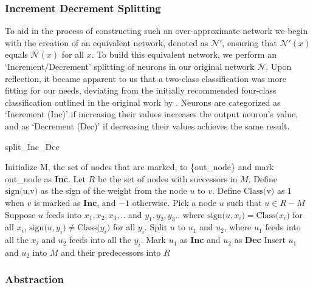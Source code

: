 \subsubsection{Increment Decrement Splitting}
To aid in the process of constructing such an over-approximate network 
we begin with the creation of an equivalent network, denoted as $\mathcal{N}'$,
 ensuring that $\mathcal{N'}(x)$ equals $\mathcal{N}(x)$ for all $x$.
To build this equivalent network, we perform an `Increment/Decrement'
splitting of neurons in our original network $\mathcal{N}$. Upon reflection, 
it became apparent to us that a two-class classification was more fitting for 
our needs, deviating from the initially recommended four-class classification 
outlined in the original work by \cite{b2}. Neurons are categorized as 
`Increment (Inc)' if increasing their values increases the output neuron's value,
 and as `Decrement (Dec)' if decreasing their values achieves the same result.

\begin{algorithm}[H]
    \caption{split\_Inc\_Dec}
    \begin{algorithmic}[1]
        \State Initialize M, the set of nodes that are marked, to \{out\_node\} and mark out\_node as \textbf{Inc}.
        \State Let $R$ be the set of nodes with successors in $M$.
        \State Define $\text{sign(u,v)}$ as the sign of the weight from the node $u$ to $v$.
        \State Define $\text{Class(v)}$ as $1$ when $v$ is marked as $\textbf{Inc}$, and $-1$ otherwise.
        \State Pick a node $u$ such that $u \in R-M$
        \State Suppose $u$ feeds into $x_1,x_2,x_3,..$ and $y_1,y_2,y_3..$ where $\text{sign($u,x_i$)} = \text{Class($x_i$)}$ for all $x_i$, $\text{sign($u,y_i$)} \neq \text{Class($y_i$)}$ for all $y_i$.
        \State Split $u$ to $u_1$ and $u_2$, where $u_1$ feeds into all the $x_i$ and $u_2$ feeds into all the $y_i$.
        \State Mark $u_1$ as \textbf{Inc} and $u_2$ as \textbf{Dec}
        \State Insert $u_1$ and $u_2$ into $M$ and their predecessors into $R$
        \EndWhile
        \end{algorithmic}
\end{algorithm}


\subsubsection{Abstraction}

